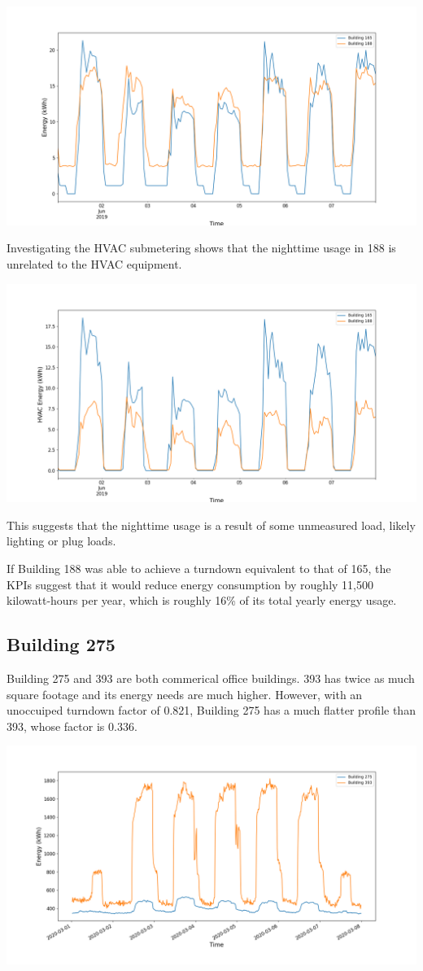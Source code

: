 \documentclass[a4paper]{article}
\begin{document}
\includegraphics[width=.8\columnwidth]{./images/188v165_Turndown.png}

Investigating the HVAC submetering shows that the nighttime usage in 188 is unrelated to the HVAC equipment.

\includegraphics[width=.8\columnwidth]{./images/188v165_Turndown_HVAC.png}

This suggests that the nighttime usage is a result of some unmeasured load, likely lighting or plug loads.

If Building 188 was able to achieve a turndown equivalent to that of 165, the KPIs suggest that it would reduce energy consumption by roughly 11,500 kilowatt-hours per year, which is roughly 16\% of its total yearly energy usage.

\subsection{Building 275}

Building 275 and 393 are both commerical office buildings. 393 has twice as much square footage and its energy needs are much higher. However, with an unoccuiped turndown factor of 0.821, Building 275 has a much flatter profile than 393, whose factor is 0.336.

\includegraphics[width=.8\columnwidth]{./images/275v393_Turndown.png}
\end{document}
